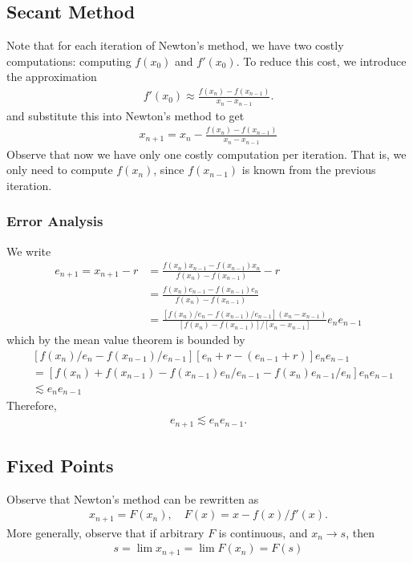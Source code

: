 \documentclass[12pt,reqno]{amsart}
\numberwithin{equation}{section}  %
\begin{document}
\subsection{Secant Method}
Note that for each iteration of Newton's method, we have
two costly computations: computing $f(x_0)$ and $f'(x_0)$.
To reduce this cost, we introduce the approximation
\begin{align*}
f'(x_0) \approx \frac{f(x_n) - f(x_{n-1})}{x_n - x_{n-1}}.
\end{align*}
and substitute this into Newton's method to get
\begin{align*}
x_{n+1} = x_n - \frac{f(x_n) - f(x_{n-1})}{x_n - x_{n-1}}
\end{align*}
Observe that now we have only one costly computation per iteration.
That is, we only need to compute $f(x_n)$, since $f(x_{n-1})$ is known
from the previous iteration. 
\subsubsection{Error Analysis}
We write
\begin{align*}
e_{n+1} = x_{n+1}-r
& = \frac{f(x_n)x_{n-1} - f(x_{n-1})x_n}{f(x_n) - f(x_{n-1})} - r
\\
& = \frac{f(x_n)e_{n-1} - f(x_{n-1})e_n}{f(x_n) - f(x_{n-1})}
\\
& = \frac{[f(x_n)/e_n - f(x_{n-1})/e_{n-1}](x_n - x_{n-1})}{[f(x_n) - f(x_{n-1})]/[x_n - x_{n-1}]}e_n e_{n-1}
\end{align*}
which by the mean value theorem is bounded by
\begin{align*}
& [f(x_n)/e_n - f(x_{n-1})/e_{n-1}][e_n + r - (e_{n-1} + r)]e_n e_{n-1}
\\
& = [f(x_n)  + f(x_{n-1}) - f(x_{n-1})e_n / e_{n-1} - f(x_n)e_{n-1}/e_n]e_n e_{n-1} 
\\
& \lesssim e_n e_{n-1}
\end{align*}
Therefore,
\begin{align*}
e_{n+1} \lesssim e_n e_{n-1}.
\end{align*}
\subsection{Fixed Points}
Observe that Newton's method can be rewritten as 
\begin{align*}
x_{n+1} = F(x_n), \quad F(x) = x - f(x)/f'(x).
\end{align*}
More generally, observe that if arbitrary $F$ is continuous, and
$x_n \to s$, then
\begin{align*}
s = \lim {x_{n+1}} = \lim F(x_n) = F(s)
\end{align*}
\end{document}
